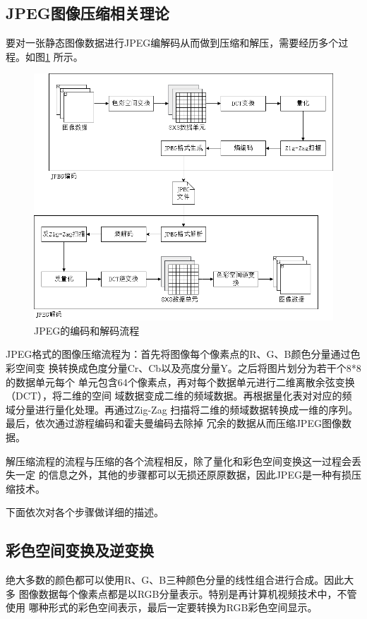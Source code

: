 \documentclass{article}
\numberwithin {equation}{section}
\begin{document}
\begin{spacing}{1.25}
\section{JPEG图像压缩相关理论}
  要对一张静态图像数据进行JPEG编解码从而做到压缩和解压，需要经历多个过程。如图\ref{jpeg}
  所示。
  \begin{figure}[H]
    \centering
    \includegraphics[scale=0.45]{./pictures/编解码流程.png}
    \caption{JPEG的编码和解码流程}\label{jpeg}
  \end{figure}
  JPEG格式的图像压缩流程为：首先将图像每个像素点的R、G、B颜色分量通过色彩空间变
  换转换成色度分量Cr、Cb以及亮度分量Y。之后将图片划分为若干个8*8的数据单元每个
  单元包含64个像素点，再对每个数据单元进行二维离散余弦变换（DCT），将二维的空间
  域数据变成二维的频域数据。再根据量化表对对应的频域分量进行量化处理。再通过Zig-Zag
  扫描将二维的频域数据转换成一维的序列。最后，依次通过游程编码和霍夫曼编码去除掉
  冗余的数据从而压缩JPEG图像数据。

  解压缩流程的流程与压缩的各个流程相反，除了量化和彩色空间变换这一过程会丢失一定
  的信息之外，其他的步骤都可以无损还原原数据，因此JPEG是一种有损压缩技术。

  下面依次对各个步骤做详细的描述。
  \subsection{彩色空间变换及逆变换}
    \vspace{1em}
    绝大多数的颜色都可以使用R、G、B三种颜色分量的线性组合进行合成。因此大多
    图像数据每个像素点都是以RGB分量表示。特别是再计算机视频技术中，不管使用
    哪种形式的彩色空间表示，最后一定要转换为RGB彩色空间显示。


\end{spacing}
\end{document}
